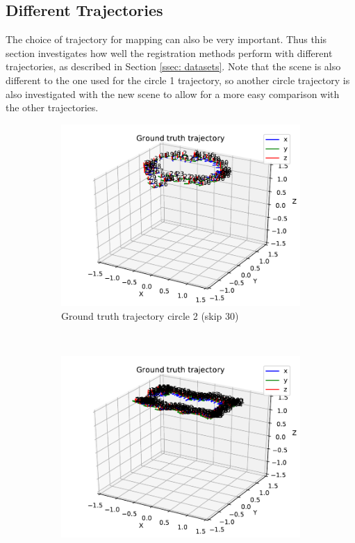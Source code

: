 \documentclass[12pt,a4paper]{article}
\begin{document}
  \subsection{Different Trajectories}
    \label{ssec: res scene 2}
    The choice of trajectory for mapping can also be very important. Thus this section investigates how well the registration methods perform with different trajectories, as described in Section \ref{ssec: datasets}. Note that the scene is also different to the one used for the circle 1 trajectory, so another circle trajectory is also investigated with the new scene to allow for a more easy comparison with the other trajectories.

        \begin{figure}[p]
      \begin{subfigure}[t]{0.3\textwidth}
      \centering
        \includegraphics[width=\textwidth]{../quad/basic-reg-saves-new-circle/30/atrj_gt.pdf}
        \caption{Ground truth trajectory circle 2 (skip 30)}
        \label{f: gt circle 2}
      \end{subfigure} %
      ~
      \begin{subfigure}[t]{0.3\textwidth}
        \includegraphics[width=\textwidth]{../quad/basic-reg-saves-new-rectangle-2/20/atrj_gt.pdf}

\end{subfigure}
\end{figure}
\end{document}

